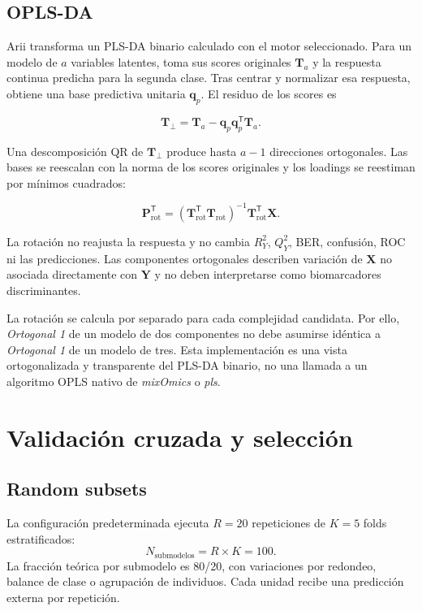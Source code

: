 \documentclass[11pt,a4paper,openany]{report}
\newcommand{\mixOmics}{\textit{mixOmics}}
\newcommand{\plsPkg}{\textit{pls}}
\newcommand{\RtwoY}{R^{2}_{Y}}
\newcommand{\QtwoY}{Q^{2}_{Y}}
\newcommand{\vect}[1]{\boldsymbol{#1}}
\begin{document}
\newpage

\section{OPLS-DA}
Arii transforma un PLS-DA binario calculado con el motor seleccionado. Para un modelo de $a$ variables latentes, toma sus scores originales $\vect{T}_a$ y la respuesta continua predicha para la segunda clase. Tras centrar y normalizar esa respuesta, obtiene una base predictiva unitaria $\vect{q}_p$. El residuo de los scores es

\begin{equation}
  \vect{T}_{\perp}=\vect{T}_a-
  \vect{q}_p\vect{q}_p^{\mathsf T}\vect{T}_a.
\end{equation}

Una descomposición QR de $\vect{T}_{\perp}$ produce hasta $a-1$ direcciones ortogonales. Las bases se reescalan con la norma de los scores originales y los loadings se reestiman por mínimos cuadrados:

\begin{equation}
  \vect{P}_{\mathrm{rot}}^{\mathsf T}=
  (\vect{T}_{\mathrm{rot}}^{\mathsf T}\vect{T}_{\mathrm{rot}})^{-1}
  \vect{T}_{\mathrm{rot}}^{\mathsf T}\vect{X}.
\end{equation}

La rotación no reajusta la respuesta y no cambia $\RtwoY$, $\QtwoY$, BER, confusión, ROC ni las predicciones. Las componentes ortogonales describen variación de $\vect{X}$ no asociada directamente con $\vect{Y}$ y no deben interpretarse como biomarcadores discriminantes.

La rotación se calcula por separado para cada complejidad candidata. Por ello, \emph{Ortogonal 1} de un modelo de dos componentes no debe asumirse idéntica a \emph{Ortogonal 1} de un modelo de tres. Esta implementación es una vista ortogonalizada y transparente del PLS-DA binario, no una llamada a un algoritmo OPLS nativo de \mixOmics{} o \plsPkg.

\chapter{Validación cruzada y selección}
\section{Random subsets}
La configuración predeterminada ejecuta $R=20$ repeticiones de $K=5$ folds estratificados:
\begin{equation}
  N_{\mathrm{submodelos}}=R\times K=100.
\end{equation}
La fracción teórica por submodelo es 80/20, con variaciones por redondeo, balance de clase o agrupación de individuos. Cada unidad recibe una predicción externa por repetición.
\end{document}
